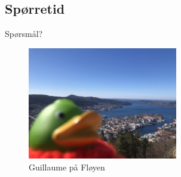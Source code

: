 \subsection*{Spørretid}
\begin{frame}{Spørsmål?}
    \begin{figure}
        \centering
        \includegraphics[height = 4.9cm]{images/guillaume10.jpg}
        \caption{Guillaume på Fløyen}
        \label{fig:guillaume10}
    \end{figure}
\end{frame}


